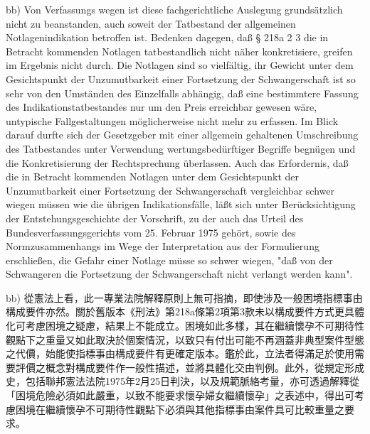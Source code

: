 \documentclass[12pt]{article}
\begin{document}
\begin{sourcepara}[title={原文E.230}]
bb) Von Verfassungs wegen ist diese fachgerichtliche Auslegung grundsätzlich nicht zu beanstanden, auch soweit der Tatbestand der allgemeinen Notlagenindikation betroffen ist. Bedenken dagegen, daß § 218a \abbrAbs{} 2 \abbrNr{} 3 \abbrStGB{} \abbrAF{} die in Betracht kommenden Notlagen tatbestandlich nicht näher konkretisiere, greifen im Ergebnis nicht durch. Die Notlagen sind so vielfältig, ihr Gewicht unter dem Gesichtspunkt der Unzumutbarkeit einer Fortsetzung der Schwangerschaft ist so sehr von den Umständen des Einzelfalls abhängig, daß eine bestimmtere Fassung des Indikationstatbestandes nur um den Preis erreichbar gewesen wäre, untypische Fallgestaltungen möglicherweise nicht mehr zu erfassen. Im Blick darauf durfte sich der Gesetzgeber mit einer allgemein gehaltenen Umschreibung des Tatbestandes unter Verwendung wertungsbedürftiger Begriffe begnügen und die Konkretisierung der Rechtsprechung überlassen. Auch das Erfordernis, daß die in Betracht kommenden Notlagen unter dem Gesichtspunkt der Unzumutbarkeit einer Fortsetzung der Schwangerschaft vergleichbar schwer wiegen müssen wie die übrigen Indikationsfälle, läßt sich unter Berücksichtigung der Entstehungsgeschichte der Vorschrift, zu der auch das Urteil des Bundesverfassungsgerichts vom 25. Februar 1975 gehört, sowie des Normzusammenhangs im Wege der Interpretation aus der Formulierung erschließen, die Gefahr einer Notlage müsse so schwer wiegen, "daß von der Schwangeren die Fortsetzung der Schwangerschaft nicht verlangt werden kann".
\end{sourcepara}
\begin{transpara}
bb) 從憲法上看，此一專業法院解釋原則上無可指摘，即使涉及一般困境指標事由構成要件亦然。關於舊版本《刑法》第218a條第2項第3款未以構成要件方式更具體化可考慮困境之疑慮，結果上不能成立。困境如此多樣，其在繼續懷孕不可期待性觀點下之重量又如此取決於個案情況，以致只有付出可能不再涵蓋非典型案件型態之代價，始能使指標事由構成要件有更確定版本。鑑於此，立法者得滿足於使用需要評價之概念對構成要件作一般性描述，並將具體化交由判例。此外，從規定形成史，包括聯邦憲法法院1975年2月25日判決，以及規範脈絡考量，亦可透過解釋從「困境危險必須如此嚴重，以致不能要求懷孕婦女繼續懷孕」之表述中，得出可考慮困境在繼續懷孕不可期待性觀點下必須與其他指標事由案件具可比較重量之要求。
\end{transpara}
\end{document}

